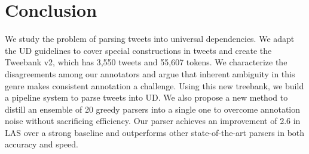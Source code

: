 \documentclass[11pt,a4paper]{article}
\begin{document}

\section{Conclusion}
We study the problem of parsing tweets into universal dependencies.
We adapt the UD guidelines to cover 
special constructions in tweets and create
the {\sc Tweebank v2}, which has 3,550 tweets  and 55,607 tokens. We characterize the disagreements
among our annotators and argue that inherent ambiguity in this genre
makes
consistent annotation a challenge.  Using this new treebank,
we build a pipeline system to parse tweets into UD. We also 
propose a new method to distill an ensemble of 20 greedy parsers into a single one
to overcome annotation noise without sacrificing efficiency.
Our parser achieves an improvement of 2.6  in LAS over a strong baseline
and outperforms other state-of-the-art parsers in both accuracy and speed.



\end{document}
